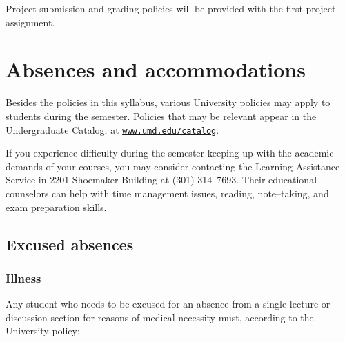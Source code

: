 \documentclass[10pt]{article}
\begin{document}

    Project submission and grading policies will be provided with the first
  project assignment.

  \section{Absences and accommodations}

    Besides the policies in this syllabus, various University policies may
  apply to students during the semester.  Policies that may be relevant
  appear in the Undergraduate Catalog, at
    \href{http://www.umd.edu/catalog}
         {\texttt{\underline{www.umd.edu/catalog}}}.

    If you experience difficulty during the semester keeping up with the
  academic demands of your courses, you may consider contacting the Learning
  Assistance Service in 2201 Shoemaker Building at (301) 314--7693.  Their
  educational counselors can help with time management issues, reading,
  note--taking, and exam preparation skills.

    \enlargethispage{4mm}

    \subsection{Excused absences}

      \subsubsection{Illness}

        Any student who needs to be excused for an absence from a single
      lecture or discussion section for reasons of medical necessity must,
      according to the University policy:

        \vspace{-2mm}
\end{document}
